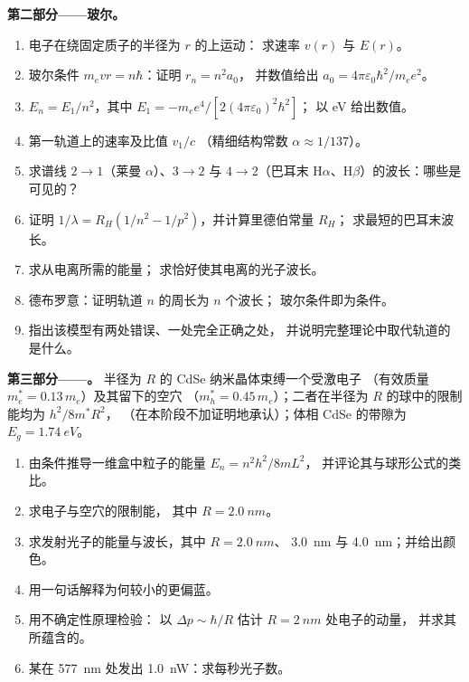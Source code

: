 \begin{problem}
\medskip
\noindent\textbf{第二部分——玻尔。}
\begin{enumerate}[resume]
  \item 电子在绕固定质子的半径为 $r$ 的上运动：
        求速率 $v(r)$ 与 $E(r)$。
  \item 玻尔条件 $m_evr = n\hbar$：证明 $r_n = n^2a_0$，
        并数值给出 $a_0 = 4\pi\varepsilon_0\hbar^2/m_ee^2$。
  \item $E_n = E_1/n^2$，其中 $E_1 = -m_ee^4/[2(4\pi\varepsilon_0)^2\hbar^2]$；
        以 eV 给出数值。
  \item 第一轨道上的速率及比值 $v_1/c$
        （精细结构常数 $\alpha \approx 1/137$）。
  \item 求谱线 $2 \to 1$（莱曼 $\alpha$）、$3 \to 2$
        与 $4 \to 2$（巴耳末 H$\alpha$、H$\beta$）的波长：哪些是可见的？
  \item 证明 $1/\lambda = R_H(1/n^2 - 1/p^2)$，并计算里德伯常量 $R_H$；
        求最短的巴耳末波长。
  \item 求从电离所需的能量；
        求恰好使其电离的光子波长。
  \item 德布罗意：证明轨道 $n$ 的周长为 $n$ 个波长；
        玻尔条件即为条件。
  \item 指出该模型有两处错误、一处完全正确之处，
        并说明完整理论中取代轨道的是什么。
\end{enumerate}

\medskip
\noindent\textbf{第三部分——。}
半径为 $R$ 的 CdSe 纳米晶体束缚一个受激电子
（有效质量 $m_e^\ast = 0.13\,m_e$）及其留下的空穴
（$m_h^\ast = 0.45\,m_e$）；二者在半径为 $R$ 的球中的限制能均为 $h^2/8m^\ast R^2$，
（在本阶段不加证明地承认）；体相 CdSe 的带隙为
$E_g = \qty{1.74}{eV}$。
\begin{enumerate}[resume]
  \item 由条件推导一维盒中粒子的能量
        $E_n = n^2h^2/8mL^2$，
        并评论其与球形公式的类比。
  \item 求电子与空穴的限制能，
        其中 $R = \qty{2.0}{nm}$。
  \item 求发射光子的能量与波长，其中 $R = \qty{2.0}{nm}$、
        \qty{3.0}{nm} 与 \qty{4.0}{nm}；并给出颜色。
  \item 用一句话解释为何较小的更偏蓝。
  \item 用不确定性原理检验：
        以 $\Delta p \sim \hbar/R$ 估计 $R = \qty{2}{nm}$ 处电子的动量，
        并求其所蕴含的。
  \item 某在 \qty{577}{nm} 处发出 \qty{1.0}{nW}：求每秒光子数。
\end{enumerate}


\end{problem}
